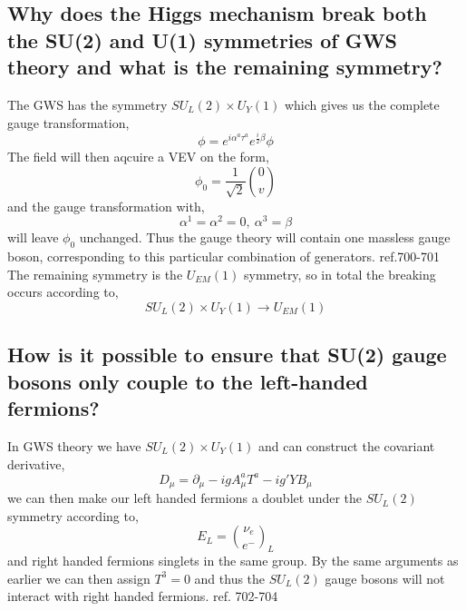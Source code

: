 \documentclass[paper=a4, fontsize=11pt]{scrartcl} %
\numberwithin{equation}{section} %
\numberwithin{figure}{section} %
\numberwithin{table}{section} %
\begin{document}
\subsection{Why does the Higgs mechanism break both the SU(2) and U(1) symmetries of GWS theory and what is the remaining symmetry?}
The GWS has the symmetry $SU_L(2) \times U_Y(1)$ which gives us the complete gauge transformation,
\begin{equation}
\phi = e^{i\alpha ^a \tau ^a} e^{\frac{i}{2}\beta} \phi
\end{equation}
The field will then aqcuire a VEV on the form,
\begin{equation}
\phi_0 = \frac{1}{\sqrt{2}} {0 \choose v}
\end{equation}
and the gauge transformation with,
\begin{equation}
\alpha ^1 = \alpha ^2 = 0, ~ \alpha ^3 = \beta
\end{equation}
will leave $\phi_0$ unchanged. Thus the gauge theory will contain one massless gauge boson, corresponding to this particular combination of generators.
ref.700-701
The remaining symmetry is the $U_{EM}(1)$ symmetry, so in total the breaking occurs according to,
\begin{equation}
SU_L(2) \times U_Y(1) \rightarrow U_{EM}(1)
\end{equation}
\subsection{How is it possible to ensure that SU(2) gauge bosons only couple to the left-handed fermions?}
In GWS theory we have $SU_L(2) \times U_Y(1)$ and can construct the covariant derivative, 
\begin{equation}
D_{\mu} = \partial_{\mu} - igA_{\mu}^aT^a-ig'YB_{\mu}
\end{equation}
we can then make our left handed fermions a doublet under the $SU_L(2)$ symmetry according to,
\begin{equation}
E_L = {\nu_e \choose e^-}_L
\end{equation}
and right handed fermions singlets in the same group. By the same arguments as earlier we can then assign $T^3 = 0$ and thus the $SU_L(2)$ gauge bosons will not interact with right handed fermions.
ref. 702-704
\end{document}
